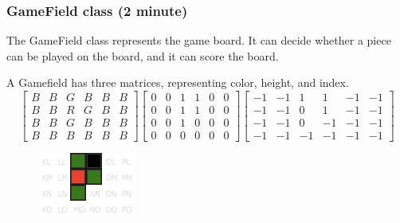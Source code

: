 \documentclass{beamer}
\begin{document}
\begin{frame}
\frametitle{GameField class (2 minute)}
The GameField class represents the game board. It can decide whether a piece can be played on the board, and it can score the board.

A Gamefield has three matrices, representing color, height, and index.
\tiny\[
  \begin{bmatrix}
    B & B & G & B & B & B \\ 
    B & B & R & G & B & B \\ 
    B & B & G & B & B & B \\ 
    B & B & B & B & B & B
  \end{bmatrix}
  \begin{bmatrix}
    0 & 0 & 1 & 1 & 0 & 0 \\ 
    0 & 0 & 1 & 1 & 0 & 0 \\ 
    0 & 0 & 1 & 0 & 0 & 0 \\ 
    0 & 0 & 0 & 0 & 0 & 0
  \end{bmatrix}
  \begin{bmatrix}
    -1 & -1 &  1 &  1 & -1 & -1 \\ 
    -1 & -1 &  0 &  1 & -1 & -1 \\ 
    -1 & -1 &  0 & -1 & -1 & -1 \\ 
    -1 & -1 & -1 & -1 & -1 & -1
  \end{bmatrix}
\]
\begin{figure}
\includegraphics[width=0.4\linewidth]{1}
\end{figure}
\end{frame}
\end{document}
